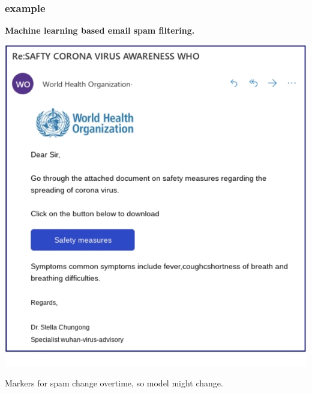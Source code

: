 \documentclass[compress]{beamer}
\begin{document}
\begin{frame}
	\frametitle{example}
	\begin{center}
		\textbf{Machine learning  based email spam filtering.}
	\end{center}
	\begin{center}
		\includegraphics[width=.5\textwidth]{covid_spam.png}
	\end{center}
	Markers for spam change overtime, so model might change.
\end{frame}
\end{document}
